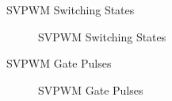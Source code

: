 
\begin{frame}{SVPWM Switching States}
	\begin{figure}
		\centering
		\caption{SVPWM Switching States}
	\end{figure}
\end{frame}


\begin{frame}{SVPWM Gate Pulses}
	\begin{figure}
		\centering
		\caption{SVPWM Gate Pulses}
	\end{figure}
\end{frame}


